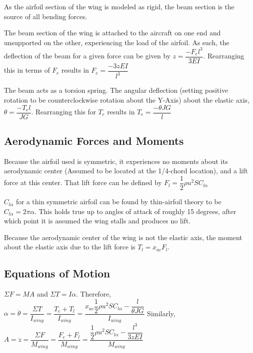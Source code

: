 \documentclass[]{article}
\begin{document}
As the airfoil section of the wing is modeled as rigid, the beam section is the source of all bending forces. 

The beam section of the wing is attached to the aircraft on one end and unsupported on the other, experiencing the load of the airfoil. As such, the deflection of the beam for a given force  can be given by $z = \dfrac{-{F_e} l^3}{3EI}$.\cite{machinerys} Rearranging this in terms of $F_e$ results in $F_e = \dfrac{ -3zEI}{l^3}$

The beam acts as a torsion spring. The angular deflection (setting positive rotation to be counterclockwise rotation about the Y-Axis) about the elastic axis, $\theta = \dfrac{- T_e l}{JG}$. \cite{machinerys} Rearranging this for $T_e$ results in $T_e = \dfrac{-\theta JG}{l}$


\subsection{Aerodynamic Forces and Moments}

Because the airfoil used is symmetric, it experiences no moments about its aerodynamic center (Assumed to be located at the 1/4-chord location), and a lift force at this center. That lift force can be defined by $F_l = \dfrac{1}{2} \rho u^2 S C_{l\alpha}$  \cite{article}

$C_{l\alpha}$ for a thin symmetric airfoil can be found by thin-airfoil theory to be $C_{l\alpha} = 2 \pi \alpha $.  \cite{article} This holds true up to angles of attack of roughly 15 degrees, after which point it is assumed the wing stalls and produces no lift.

Because the aerodynamic center of the wing is not the elastic axis, the moment about the elastic axis due to the lift force is $T_l = x_{ac} F_l$. \cite{article}


\subsection{Equations of Motion}

 $\Sigma F = MA$ and $\Sigma T = I \alpha$.
 Therefore, $\alpha = \ddot{\theta} = \dfrac{\Sigma T}{I_{wing}} = \dfrac{T_e+T_l}{I_{wing}} = \dfrac{x_{ac} \dfrac{1}{2} \rho u^2 S C_{l\alpha} - \dfrac{l}{\theta JG}}{I_{wing}}$
 Similarly, $A = \ddot{z} = \dfrac{\Sigma F }{M_{wing}} = \dfrac{F_e+F_l}{M_{wing}} = \dfrac{\dfrac{1}{2} \rho u^2 S C_{l\alpha}-\dfrac{l^3}{3zEI}}{M_{wing}}$
 
 
\end{document}
